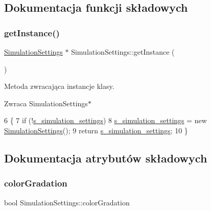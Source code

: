 \subsection{Dokumentacja funkcji składowych}
\mbox{\label{class_simulation_settings_ab69bcd8bb611656b17d1f655d09a3004}} 
\subsubsection{\texorpdfstring{get\+Instance()}{getInstance()}}
{\footnotesize\ttfamily \mbox{\hyperlink{class_simulation_settings}{Simulation\+Settings}} $\ast$ Simulation\+Settings\+::get\+Instance (\begin{DoxyParamCaption}{ }\end{DoxyParamCaption})\hspace{0.3cm}{\ttfamily [static]}}

Metoda zwracająca instancje klasy. \begin{DoxyReturn}{Zwraca}
Simulation\+Settings$\ast$ 
\end{DoxyReturn}

\begin{DoxyCode}
6 \{
7     \textcolor{keywordflow}{if} (!\mbox{\hyperlink{class_simulation_settings_a725fb3d79c85db8cd446425fac82b50a}{s\_simulation\_settings}})
8         \mbox{\hyperlink{class_simulation_settings_a725fb3d79c85db8cd446425fac82b50a}{s\_simulation\_settings}} = \textcolor{keyword}{new} \mbox{\hyperlink{class_simulation_settings_a2fafe4514597b881fbec0caced94c0e5}{SimulationSettings}}();
9     \textcolor{keywordflow}{return} \mbox{\hyperlink{class_simulation_settings_a725fb3d79c85db8cd446425fac82b50a}{s\_simulation\_settings}};
10 \}
\end{DoxyCode}


\subsection{Dokumentacja atrybutów składowych}
\mbox{\label{class_simulation_settings_a131a5c0b576e510b4c61c3c19b0efe81}} 
\subsubsection{\texorpdfstring{color\+Gradation}{colorGradation}}
{\footnotesize\ttfamily bool Simulation\+Settings\+::color\+Gradation}

